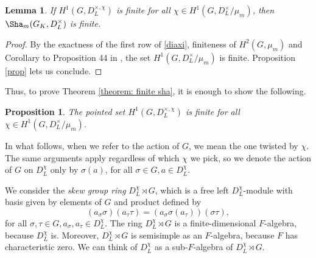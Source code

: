 \documentclass[a4paper,10pt]{amsart}
\theoremstyle{plain}
\newtheorem{lemma}[theorem]{Lemma}
\newtheorem{proposition}[theorem]{Proposition}
\theoremstyle{definition}
\theoremstyle{remark}
\newcommand{\bD}{D_L}
\begin{document}
\begin{lemma}\label{lemma: finiteness of sha}
If \(H^1(G, \bD^{\times, \chi})\) is finite for all \(\chi \in H^1(G, \bD^{\times}/\mu_m)\), then \(\Sha_m(G_K, \bD^\times)\) is finite.
\end{lemma}
\begin{proof} By the exactness of the first row of \eqref{diaxi}, finiteness of \(H^2(G, \mu_m)\) and Corollary to Proposition 44 in \cite[\S5]{Serre-Galois}, the set \(H^1(G, \bD^\times/\mu_m)\) is finite. Proposition \ref{prop} lets us conclude.
\end{proof}
Thus, to prove Theorem \ref{theorem: finite sha}, it is enough to show the following.
\begin{proposition}\label{prop: cohom finiteness}
The pointed set \(H^1(G, \bD^{\times, \chi})\) is finite for all \(\chi \in H^1(G, \bD^{\times}/\mu_m)\).
\end{proposition}
In what follows, when we refer to the action of \(G\), we mean the one twisted by \(\chi\). The same arguments apply regardless of which \(\chi\) we pick, so we denote the action of \(G\) on \(\bD^\chi\) only by \(\sigma(a)\), for all \(\sigma \in G, a \in \bD^\chi\).

We consider the \emph{skew group ring} \(\bD^\chi \rtimes G\), which is a free left \(\bD^\chi\)-module with basis given by elements of \(G\) and product defined by
\[
    (a_\sigma \sigma)(a_\tau \tau) = (a_\sigma \sigma(a_\tau))(\sigma \tau),
\]
for all \(\sigma, \tau \in G, a_\sigma, a_\tau \in \bD^\chi\). The ring \(\bD^\chi \rtimes G\) is a finite-dimensional \(F\)-algebra, because \(\bD^\chi\) is. Moreover, \(\bD^\chi \rtimes G\) is semisimple as an \(F\)-algebra, because \(F\) has characteristic zero. %
We can think of \(\bD^\chi\) as a sub-\(F\)-algebra of \(\bD^\chi \rtimes G\).
\end{document}
